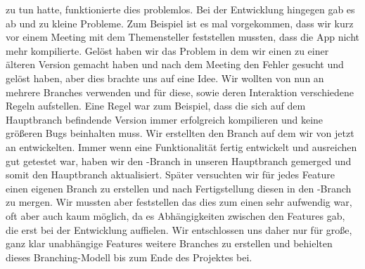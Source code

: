 \documentclass[10pt]{article}
\begin{document}
zu tun hatte, funktionierte dies problemlos. Bei der Entwicklung hingegen gab es ab und zu kleine Probleme.
Zum Beispiel ist es mal vorgekommen, dass wir kurz vor einem Meeting mit dem Themensteller feststellen mussten, dass
die App nicht mehr kompilierte. Gelöst haben wir das Problem in dem wir einen  zu einer älteren Version
gemacht haben und nach dem Meeting den Fehler gesucht und gelöst haben, aber dies brachte uns auf eine Idee.
Wir wollten von nun an mehrere Branches verwenden und für diese, sowie deren Interaktion verschiedene Regeln aufstellen.
Eine Regel war zum Beispiel, dass die sich auf dem Hauptbranch befindende Version immer erfolgreich kompilieren
und keine größeren Bugs beinhalten muss. Wir erstellten den Branch  auf dem wir von jetzt an entwickelten.
Immer wenn eine Funktionalität fertig entwickelt und ausreichen gut getestet war, haben wir den -Branch in
unseren Hauptbranch gemerged und somit den Hauptbranch aktualisiert. Später versuchten wir für jedes Feature einen
eigenen Branch zu erstellen und nach Fertigstellung diesen in den -Branch zu mergen. Wir mussten aber feststellen
das dies zum einen sehr aufwendig war, oft aber auch kaum möglich, da es Abhängigkeiten zwischen den Features gab,
die erst bei der Entwicklung auffielen. Wir entschlossen uns daher nur für große, ganz klar unabhängige Features
weitere Branches zu erstellen und behielten dieses Branching-Modell bis zum Ende des Projektes bei.
\end{document}
